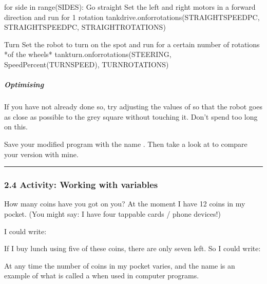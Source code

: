 \documentclass[letterpaper,10pt,english]{sphinxmanual}
\begin{document}
{{\begin{sphinxVerbatim}[commandchars=\\\{\}]
for side in range(SIDES):
    \PYGZsh{}Go straight
    \PYGZsh{} Set the left and right motors in a forward direction
    \PYGZsh{} and run for 1 rotation
    tank\PYGZus{}drive.on\PYGZus{}for\PYGZus{}rotations(STRAIGHT\PYGZus{}SPEED\PYGZus{}PC, STRAIGHT\PYGZus{}SPEED\PYGZus{}PC, STRAIGHT\PYGZus{}ROTATIONS)

    \PYGZsh{}Turn
    \PYGZsh{} Set the robot to turn on the spot
    \PYGZsh{} and run for a certain number of rotations *of the wheels*
    tank\PYGZus{}turn.on\PYGZus{}for\PYGZus{}rotations(STEERING, SpeedPercent(TURN\PYGZus{}SPEED), TURN\PYGZus{}ROTATIONS)

\end{sphinxVerbatim}
}


\subparagraph{Optimising}
\label{\detokenize{content/01_Robot_Lab/Section_00_02:Optimising}}
If you have not already done so, try adjusting the values of  so that the robot goes as close as possible to the grey square without touching it. Don’t spend too long on this.

Save your modified program with the name . Then take a look at  to compare your version with mine.


\bigskip\hrule\bigskip



\subsubsection{2.4 Activity: Working with variables}
\label{\detokenize{content/01_Robot_Lab/Section_00_02:2.4-Activity:-Working-with-variables}}
How many coins have you got on you? At the moment I have 12 coins in my pocket. (You might say: I have four tappable cards / phone devices!)

I could write:


If I buy lunch using five of these coins, there are only seven left. So I could write:


At any time the number of coins in my pocket varies, and the name  is an example of what is called a  when used in computer programs.

}
\end{document}
